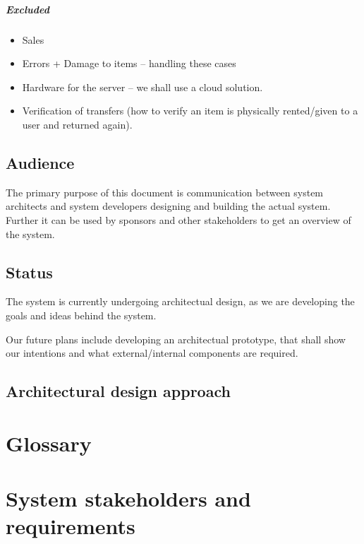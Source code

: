 \documentclass[a4paper,11pt]{report}
\begin{document}
\paragraph{Excluded}
\begin{itemize}
\item Sales
\item Errors + Damage to items -- handling these cases
\item Hardware for the server -- we shall use a cloud solution.
\item Verification of transfers (how to verify an item is physically rented/given to a user and returned again).
\end{itemize}

\section{Audience}
\label{sec:audience}
The primary purpose of this document is communication between system architects
and system developers designing and building the actual system.
Further it can be used by sponsors and other stakeholders to get an overview of
the system.

\section{Status}
\label{sec:status}
The system is currently undergoing architectual design, as we are developing
the goals and ideas behind the system.

Our future plans include developing an architectual prototype, that shall show
our intentions and what external/internal components are required.

\section{Architectural design approach}
\label{sec:arch-design-appr}


\chapter{Glossary}
\label{cha:glossary}
\thispagestyle{fancy}

\chapter{System stakeholders and requirements}
\label{cha:syst-stak-requ}
\thispagestyle{fancy}
\end{document}
